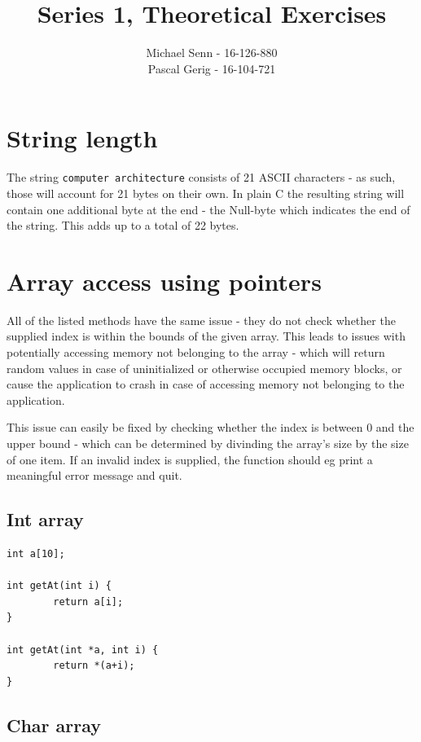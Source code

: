 \documentclass[a4paper]{scrartcl}
\title{Series 1, Theoretical Exercises}
\author{Michael Senn - 16-126-880\\ Pascal Gerig - 16-104-721}
\date{}
\begin{document}
\maketitle


\section{String length}

The string \texttt{computer architecture} consists of 21 ASCII characters - as
such, those will account for 21 bytes on their own. In plain C the resulting
string will contain one additional byte at the end - the Null-byte which
indicates the end of the string. This adds up to a total of 22 bytes.

\section{Array access using pointers}

All of the listed methods have the same issue - they do not check whether the
supplied index is within the bounds of the given array. This leads to issues
with potentially accessing memory not belonging to the array - which will
return random values in case of uninitialized or otherwise occupied memory
blocks, or cause the application to crash in case of accessing memory not
belonging to the application.

This issue can easily be fixed by checking whether the index is between 0 and
the upper bound - which can be determined by divinding the array's size by the
size of one item. If an invalid index is supplied, the function should eg print
a meaningful error message and quit.

\subsection{Int array}

\begin{lstlisting}
int a[10];

int getAt(int i) {
        return a[i];
}

int getAt(int *a, int i) {
        return *(a+i);
}
\end{lstlisting}


\subsection{Char array}
\end{document}
